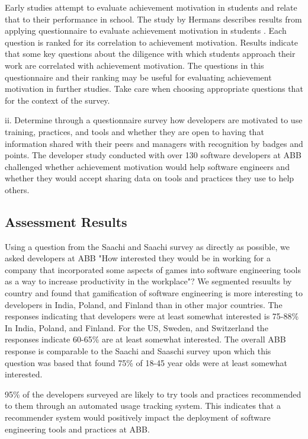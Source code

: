 \documentclass{sig-alternate}
\begin{document}
Early studies attempt to evaluate achievement motivation in students and relate that to their performance in school.  The study by Hermans describes results from applying questionnaire to evaluate achievement motivation in students \cite{wbsnipes:Hermans1970Questionnaire}.  Each question is ranked for its correlation to achievement motivation. Results indicate that some key questions about the diligence with which students approach their work are correlated with achievement motivation.  The questions in this questionnaire and their ranking may be useful for evaluating achievement motivation in further studies.  Take care when choosing appropriate questions that for the context of the survey.

ii.	Determine through a questionnaire survey how developers are motivated to use training, practices, and tools and whether they are open to having that information shared with their peers and managers with recognition by badges and points. The developer study conducted with over 130 software developers at ABB challenged whether achievement motivation would help software engineers and whether they would accept sharing data on tools and practices they use to help others.

\subsection{Assessment Results}

Using a question from the Saachi and Saachi survey\cite{wbsnipes:SaatchiGameification} as directly as possible, we asked developers at ABB "How interested they would be in working for a company that incorporated some aspects of games into software engineering tools as a way to increase productivity in the workplace"?  We segmented resuults by country and found that gamification of software engineering is more interesting to developers in India, Poland, and Finland than in other major countries.  The responses indicating that developers were at least somewhat interested is 75-88\% In India, Poland, and Finland.  For the US, Sweden, and Switzerland the responses indicate 60-65\% are at least somewhat interested.  The overall ABB response is comparable to the Saachi and Saaschi survey\cite{wbsnipes:SaatchiGameification} upon which this question was based that found 75\% of 18-45 year olds were at least somewhat interested.  

95\% of the developers surveyed are likely to try tools and practices recommended to them through an automated usage tracking system.  This indicates that a recommender system would positively impact the deployment of software engineering tools and practices at ABB.
\end{document}
